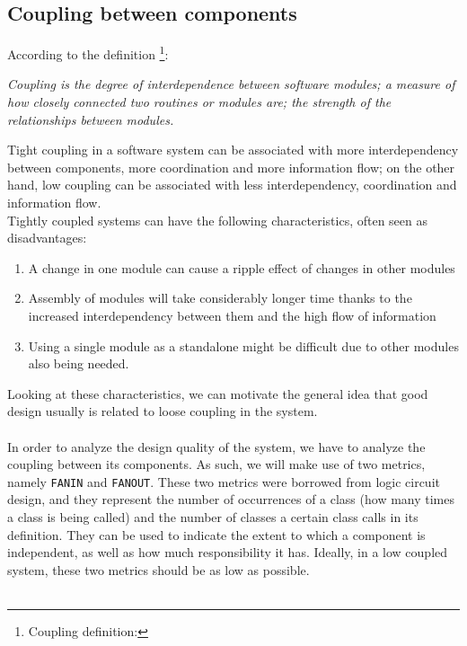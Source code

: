 \subsection{Coupling between components}
    According to the definition
    \footnote{Coupling definition: }:
    \begin{adjustwidth}{1.5cm}{}
        \textit{Coupling is the degree of interdependence between software modules; a measure of how closely connected two routines or modules are; the strength of the relationships between modules.}\\
    \end{adjustwidth}
    Tight coupling in a software system can be associated with more interdependency between components, more coordination and more information flow; on the other hand, low coupling can be associated with less interdependency, coordination and information flow. \\
    Tightly coupled systems can have the following characteristics, often seen as disadvantages:
    \begin{enumerate}
        \item A change in one module can cause a ripple effect of changes in other modules 
        \item Assembly of modules will take considerably longer time thanks to the increased interdependency between them and the high flow of information
        \item Using a single module as a standalone might be difficult due to other modules also being needed.
    \end{enumerate}
    Looking at these characteristics, we can motivate the general idea that good design usually is related to loose coupling in the system.\\\\
    In order to analyze the design quality of the system, we have to analyze the coupling between its components. As such, we will make use of two metrics, namely \texttt{FANIN} and \texttt{FANOUT}. These two metrics were borrowed from logic circuit design, and they represent the number of occurrences of a class (how many times a class is being called) and the number of classes a certain class calls in its definition. They can be used to indicate the extent to which a component is independent, as well as how much responsibility it has. Ideally, in a low coupled system, these two metrics should be as low as possible. 
    \\\\
